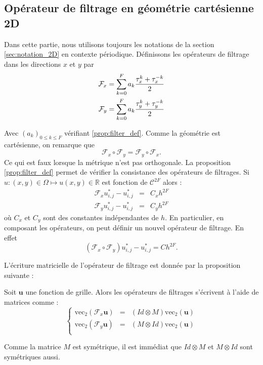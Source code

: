 \subsection{Opérateur de filtrage en géométrie cartésienne 2D}

Dans cette partie, nous utilisons toujours les notations de la section \ref{sec:notation_2D} en contexte périodique. Définissons les opérateurs de filtrage dans les directions $x$ et $y$ par
\begin{eqnarray*}
\mathcal{F}_x = \displaystyle\sum\limits_{k=0}^F a_k \dfrac{\tau_x^k + \tau_x^{-k}}{2} \\
\mathcal{F}_y = \displaystyle\sum\limits_{k=0}^F a_k \dfrac{\tau_y^k + \tau_y^{-k}}{2} \\
\end{eqnarray*}

Avec $(a_k)_{0 \leq k \leq F}$ vérifiant \ref{prop:filter_def}. Comme la géométrie est cartésienne, on remarque que 
\begin{equation}
\mathcal{F}_x \circ \mathcal{F}_y = \mathcal{F}_y \circ \mathcal{F}_x.
\end{equation}
Ce qui est faux lorsque la métrique n'est pas orthogonale.
La proposition \ref{prop:filter_def} permet de vérifier la consistance des opérateurs de filtrages.
Si $u : (x,y) \in \Omega \mapsto u(x,y) \in \mathbb{R}$ est fonction de $\mathcal{C}^{2F}$ alors :
\begin{eqnarray*}
\mathcal{F}_x u^*_{i,j} - u^*_{i,j} & = & C_xh^{2F}\\
\mathcal{F}_y u^*_{i,j} - u^*_{i,j} & = & C_yh^{2F}
\end{eqnarray*}
où $C_x$ et $C_y$ sont des constantes indépendantes de $h$.
En particulier, en composant les opérateurs, on peut définir un nouvel opérateur de filtrage. En effet  
\begin{equation}
(\mathcal{F}_x \circ \mathcal{F}_y) u_{i,j}^* - u_{i,j}^* = Ch^{2F}.
\end{equation}

L'écriture matricielle de l'opérateur de filtrage est donnée par la proposition suivante :
\begin{proposition}
Soit $\mathbf{u}$ une fonction de grille. Alors les opérateurs de filtrages s'écrivent à l'aide de matrices comme :
\begin{equation}
\left\lbrace
\begin{array}{rcl}
\text{vec}_2 (\mathcal{F}_x \mathbf{u}) & = & (Id \otimes M) \text{vec}_2 (\mathbf{u})\\
\text{vec}_2 (\mathcal{F}_y \mathbf{u}) & = & (M \otimes Id) \text{vec}_2 (\mathbf{u})\\
\end{array}
\right.
\end{equation}
\end{proposition}
Comme la matrice $M$ est symétrique, il est immédiat que $Id \otimes M$ et $M \otimes Id$ sont symétriques aussi.
















